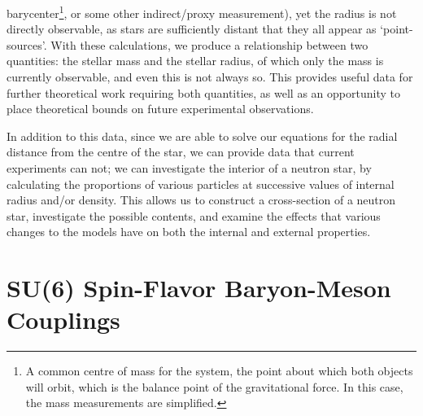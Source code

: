 \documentclass[11pt,a4paper,twoside]{carrollthesis}
\begin{document}
barycenter\footnote{A common centre of mass for the system, the point
  about which both objects will orbit, which is the balance point of
  the gravitational force. In this case, the mass measurements are
  simplified.}, or some other indirect/proxy measurement), yet the
radius is not directly observable, as stars are sufficiently distant
that they all appear as `point-sources'. With these calculations, we
produce a relationship between two quantities: the stellar mass and
the stellar radius, of which only the mass is currently observable,
and even this is not always so. This provides useful data for further
theoretical work requiring both quantities, as well as an opportunity
to place theoretical bounds on future experimental observations.\par
%
In addition to this data, since we are able to solve our equations for
the radial distance from the centre of the star, we can provide data
that current experiments can not; we can investigate the interior of a
neutron star, by calculating the proportions of various particles at
successive values of internal radius and/or density. This allows us to
construct a cross-section of a neutron star, investigate the possible
contents, and examine the effects that various changes to the models
have on both the internal and external properties.\par
%

\section{SU(6) Spin-Flavor Baryon-Meson Couplings}\label{sec:su6deriv}
\end{document}
